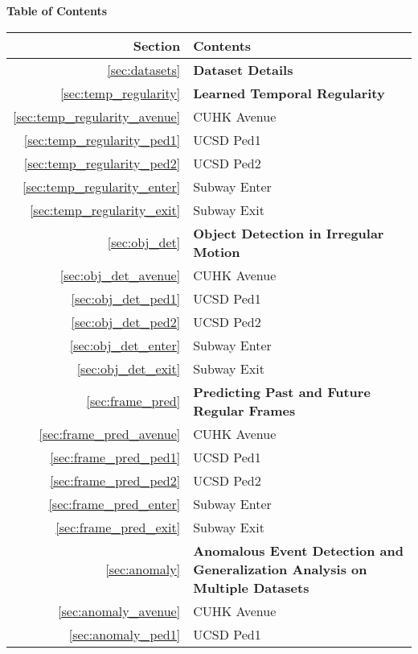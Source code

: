 \documentclass[10pt,twocolumn,letterpaper]{article}
\begin{document}
\begin{center}
	{\bf \large Table of Contents}
\end{center}
\begin{table*}[h]
	\vspace{-5mm}
	\centering
	\begin{tabular}{|r|p{12cm}|}
		\hline
		Section & Contents\\
		\hline \hline \hline
		\ref{sec:datasets} & {\bf Dataset Details} \\
		\hline \hline
		\ref{sec:temp_regularity} & {\bf Learned Temporal Regularity} \\
		\hline
		\ref{sec:temp_regularity_avenue} & CUHK Avenue \\
		\hline
		\ref{sec:temp_regularity_ped1} & UCSD Ped1 \\
		\hline
		\ref{sec:temp_regularity_ped2} & UCSD Ped2\\
		\hline
		\ref{sec:temp_regularity_enter} & Subway Enter \\
		\hline
		\ref{sec:temp_regularity_exit} & Subway Exit \\
		\hline \hline
		 \ref{sec:obj_det} & {\bf Object Detection in Irregular Motion} \\
		\hline
		\ref{sec:obj_det_avenue} & CUHK Avenue\\
		\hline
		\ref{sec:obj_det_ped1} & UCSD Ped1 \\
		\hline
		\ref{sec:obj_det_ped2} & UCSD Ped2 \\
		\hline
		\ref{sec:obj_det_enter} & Subway Enter \\
		\hline
		\ref{sec:obj_det_exit} & Subway Exit \\
		\hline \hline
		\ref{sec:frame_pred} & {\bf Predicting Past and Future Regular Frames}  \\
		\hline
		\ref{sec:frame_pred_avenue} & CUHK Avenue\\
		\hline
		\ref{sec:frame_pred_ped1} & UCSD Ped1 \\
		\hline
		\ref{sec:frame_pred_ped2} & UCSD Ped2 \\
		\hline
		\ref{sec:frame_pred_enter} & Subway Enter \\
		\hline
		\ref{sec:frame_pred_exit} & Subway Exit \\
		\hline \hline
		\ref{sec:anomaly} & {\bf Anomalous Event Detection and Generalization Analysis on Multiple Datasets} \\
		\hline
		\ref{sec:anomaly_avenue} & CUHK Avenue\\
		\hline
		\ref{sec:anomaly_ped1} & UCSD Ped1 \\

\end{tabular}
\end{table*}
\end{document}
